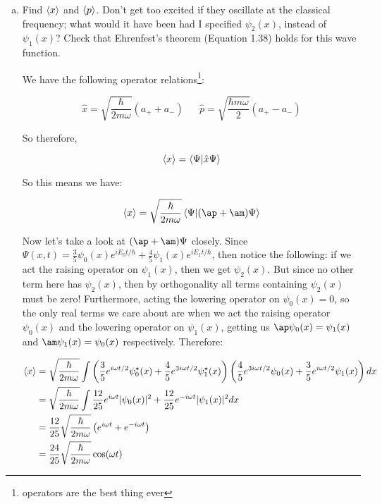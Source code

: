 \documentclass[10pt]{article}
\begin{document}
\begin{enumerate}[(a)]
\begin{solution}
        \end{solution}
        \item Find $\langle x \rangle$ and $\langle p \rangle$. Don't get too excited if they oscillate at the classical frequency; what would it have been had I specified $\psi_2(x)$, instead of $\psi_1(x)$? Check that Ehrenfest's theorem (Equation 1.38) holds for this wave function.
        
        \begin{solution}
            We have the following operator relations\footnote{operators are the best thing ever}: 

            \[\hat x = \sqrt{\frac{\hbar}{2m \omega}} (a_+ + a_-) \phantom{aaa} \hat p = \sqrt{\frac{\hbar m \omega}{2}}(a_+ - a_-)\]

            So therefore, 

            \[ \langle x \rangle = \braket{\Psi}{\hat x \Psi}\]

            So this means we have: 

            \[ \mean{x} = \sqrt{\frac{\hbar}{2m\omega}} \braket{\Psi}{(\ap + \am) \Psi}\]

            Now let's take a look at $(\ap + \am) \Psi$ closely. Since $\Psi(x, t) = \frac 35 \psi_0(x) e^{iE_0t/\hbar} + \frac 45 \psi_1(x) e^{iE_1t/\hbar}$, then notice the following: if we act the raising operator on $\psi_1(x)$, then we get $\psi_2(x)$. But since no other term here has $\psi_2(x)$, then by orthogonality all terms containing $\psi_2(x)$ must be zero! Furthermore, acting the lowering operator on $\psi_0(x) = 0$, so the only real terms we care about are when we act the raising operator $\psi_0(x)$ and the lowering operator on $\psi_1(x)$, getting us $\ap \psi_0(x) = \psi_1(x)$ and $\am \psi_1(x) = \psi_0(x)$ respectively. Therefore: 

            \begin{align*}
                \langle x \rangle &= \sqrt{\frac{\hbar}{2m\omega}} \int \left( \frac 35 e^{i \omega t/2} \psi_0^\star(x)  + \frac 45 e^{3i\omega t/2} \psi_1^\star(x)\right) \left(\frac 45 e^{3i\omega t/2}\psi_0(x) + \frac 35 e^{i\omega t/2}\psi_1(x)\right) dx\\
                &= \sqrt{\frac{\hbar}{2m\omega}} \int \frac{12}{25} e^{i\omega t} |\psi_0(x)|^2 + \frac{12}{25}e^{-i\omega t}|\psi_1(x)|^2 dx\\
                &=\frac{12}{25} \sqrt{\frac{\hbar}{2m\omega}}  \left(e^{i\omega t} + e^{-i\omega t}\right)\\
                &= \frac{24}{25} \sqrt{\frac{\hbar}{2m\omega}}\cos(\omega t)
            \end{align*}


\end{solution}
\end{enumerate}
\end{document}
